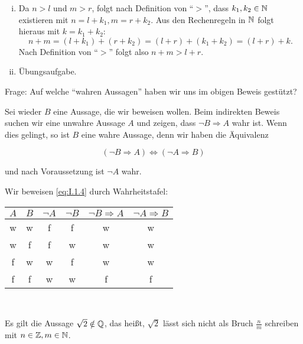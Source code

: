 \begin{beweis}
	\begin{enumerate}[(i)]
		\item Da $n > l$ und $m > r$, folgt nach Definition von \enquote{$>$}, dass $k_1, k_2 \in \mathbb{N}$ existieren mit $n = l+k_1, m = r+k_2$.
		Aus den Rechenregeln in $\mathbb{N}$ folgt hieraus mit $k = k_1 + k_2$:
		\[
			n+m = (l+k_1) + (r+k_2) = (l+r)+(k_1+k_2) = (l+r) + k.
		\]
		Nach Definition von \enquote{$>$} folgt also $n+m > l+r$.
		\item Übungsaufgabe. 
	\end{enumerate}
\end{beweis}

Frage: Auf welche \enquote{wahren Aussagen} haben wir uns im obigen Beweis gestützt?

\begin{satz}
	\label{satz:I.1.4}
	Sei wieder $B$ eine Aussage, die wir beweisen wollen.
	Beim indirekten Beweis suchen wir eine unwahre Aussage $A$ und zeigen, dass $\neg B \Rightarrow A$ wahr ist.
	Wenn dies gelingt, so ist $B$ eine wahre Aussage, denn wir haben die Äquivalenz
	
	\begin{equation}
		(\neg B \Rightarrow A) \Leftrightarrow (\neg A \Rightarrow B) \label{eq:I.1.4}
	\end{equation}
	
	und nach Voraussetzung ist $\neg A$ wahr.
\end{satz}

\begin{beweis}
	Wir beweisen \eqref{eq:I.1.4} durch Wahrheitstafel:
	\begin{center}
		\begin{tabular}{cccccc}
			$A$ & $B$ & $\neg A$ & $\neg B$ & $\neg B \Rightarrow A$ & $\neg A \Rightarrow B$ \\ 
			\hline 
			w & w & f & f & w & w \\ 
			\hline 
			w & f & f & w & w & w \\ 
			\hline 
			f & w & w & f & w & w \\ 
			\hline 
			f & f & w & w & f & f \\ 
		\end{tabular} \\
		
	\end{center}
\end{beweis}

\begin{beispiel}
	\label{bsp:I.1.5}
	Es gilt die Aussage $\sqrt{2} \notin \mathbb{Q}$, das heißt, $\sqrt{2}$ lässt sich nicht als Bruch $\frac{n}{m}$ schreiben mit $n \in \mathbb{Z}, m \in \mathbb{N}$.
\end{beispiel}

